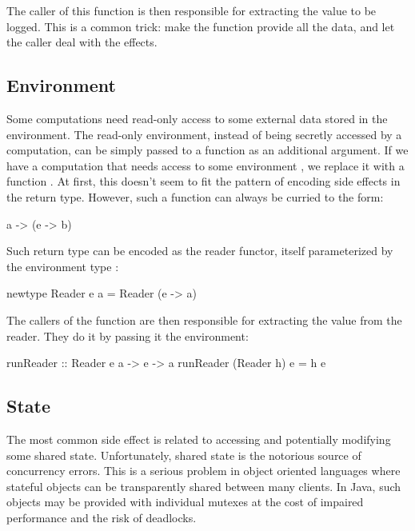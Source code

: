 \documentclass[DaoFP]{subfiles}
\begin{document}
The caller of this function is then responsible for extracting the value to be logged. This is a common trick: make the function provide all the data, and let the caller deal with the effects.

\subsection{Environment}

Some computations need read-only access to some external data stored in the environment. The read-only environment, instead of being secretly accessed by a computation, can be simply passed to a function as an additional argument. If we have a computation  that needs access to some environment , we replace it with a function . At first, this doesn't seem to fit the pattern of encoding side effects in the return type. However, such a function can always be curried to the form:
\begin{haskell}
a -> (e -> b)
\end{haskell}
Such return type can be encoded as the reader functor, itself parameterized by the environment type :
\begin{haskell}
newtype Reader e a = Reader (e -> a)
\end{haskell}
The callers of the function are then responsible for extracting the value from the reader. They do it by passing it the environment:
\begin{haskell}
runReader :: Reader e a -> e -> a
runReader (Reader h) e = h e
\end{haskell}

\subsection{State}

The most common side effect is related to accessing and potentially modifying some shared state. Unfortunately, shared state is the notorious source of concurrency errors. This is a serious problem in object oriented languages where stateful objects can be transparently shared between many clients. In Java, such objects may be provided with individual mutexes at the cost of impaired performance and the risk of deadlocks.
\end{document}
